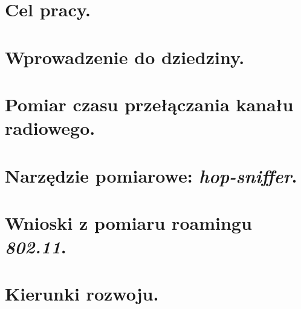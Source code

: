 \documentclass[11pt,a4paper,oneside]{report}
\begin{document}





\tableofcontents

\newpage
\thispagestyle{empty}
\mbox{}


\chapter{Cel pracy.}


\chapter{Wprowadzenie do dziedziny.}


\chapter{Pomiar czasu przełączania kanału radiowego.}


\chapter{Narzędzie pomiarowe: \emph{hop-sniffer}.}


\chapter{Wnioski z pomiaru roamingu \emph{802.11}.}


\chapter{Kierunki rozwoju.}


\nocite{*}

\end{document}
